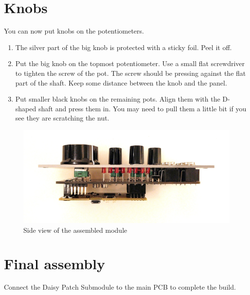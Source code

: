 \documentclass[10pt,a4paper,twocolumn]{article}
\begin{document}
\clearpage

\section{Knobs}

You can now put knobs on the potentiometers.

\begin{enumerate}
  \item The silver part of the big knob is protected with a sticky foil. Peel it off.
  \item Put the big knob on the topmost potentiometer. Use a small flat screwdriver to tighten the screw of the pot. The screw should be pressing against the flat part of the shaft. Keep some distance between the knob and the panel.
  \item Put smaller black knobs on the remaining pots. Align them with the D-shaped shaft and press them in. You may need to pull them a little bit if you see they are scratching the nut.
\end{enumerate}

\begin{figure}[p]
  \centering
  \includegraphics[width=\linewidth]{p07.jpg}
  \caption{Side view of the assembled module}
\end{figure}

\section{Final assembly}

Connect the Daisy Patch Submodule to the main PCB to complete the build.
\end{document}
